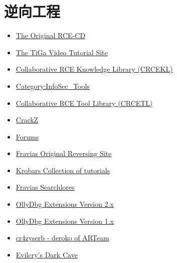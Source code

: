 
\section{逆向工程}
\begin{itemize}
\item \href{http://www.woodmann.com/RCE_CD/index.html}{The Original RCE-CD}\\
\item \href{http://www.woodmann.com/TiGa/index.html}{The TiGa Video Tutorial Site}\\
\item \href{http://www.woodmann.com/collaborative/knowledge/index.php/Category:RCE_Knowledge}{Collaborative RCE Knowledge Library (CRCEKL)}\\
\item \href{http://www.woodmann.com/collaborative/sectools/index.php/Category:InfoSec_Tools}{Category:InfoSec\_Tools}\\
\item \href{http://www.woodmann.com/collaborative/tools/index.php/Category:RCE_Tools}{Collaborative RCE Tool Library (CRCETL)}\\
\item \href{http://www.woodmann.com/crackz/index.html}{CrackZ}\\
\item \href{http://www.woodmann.com/forum/forum.php}{Forums}\\
\item \href{http://www.woodmann.com/fravia/index.htm}{Fravias Original Reversing Site}\\
\item \href{http://www.woodmann.com/krobar}{Krobars Collection of tutorials}\\
\item \href{http://www.woodmann.com/searchlores}{Fravias Searchlores}\\
\item \href{/collaborative/tools/index.php/Category:OllyDbg_2.x_Extensions}{OllyDbg Extensions Version 2.x}\\
\item \href{/collaborative/tools/index.php/Category:OllyDbg_Extensions}{OllyDbg Extensions Version 1.x}\\
\item \href{http://deroko.phearless.org/index.html}{cr4zyserb - deroko of ARTeam}\\
\item \href{http://evilcodecave.wordpress.com/}{Evilcry's Dark Cave}\\

\end{itemize}
